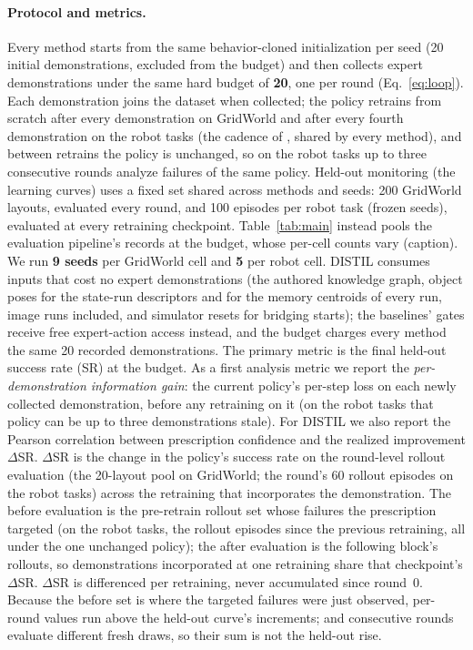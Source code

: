 \documentclass[letterpaper]{article} %
\begin{document}
\paragraph{Protocol and metrics.}
Every method starts from the same behavior-cloned initialization per seed
(20 initial demonstrations, excluded from the budget) and then collects
expert demonstrations under the same hard budget of \textbf{20}, one per
round (Eq.~\ref{eq:loop}). Each demonstration joins the dataset when collected;
the policy retrains from scratch after every demonstration on GridWorld and
after every fourth demonstration on the robot tasks (the cadence of
\citealp{lee2025diffdagger}, shared by every method), and between retrains
the policy is unchanged, so on the robot tasks up to three consecutive
rounds analyze failures of the same policy. Held-out monitoring (the
learning curves) uses a fixed set shared across methods and seeds: 200
GridWorld layouts, evaluated every round, and 100 episodes per robot task
(frozen seeds), evaluated at every retraining checkpoint.
Table~\ref{tab:main} instead pools the evaluation pipeline's records at
the budget, whose per-cell counts vary (caption). We
run \textbf{9 seeds} per
GridWorld cell and \textbf{5} per robot cell. DISTIL consumes inputs that
cost no expert demonstrations (the authored knowledge graph, object poses
for the state-run descriptors and for the memory centroids of every run,
image runs included, and simulator resets for bridging starts); the
baselines' gates receive free expert-action access instead, and the budget
charges every method the same 20 recorded demonstrations.
The primary metric is the final held-out success
rate (SR) at the budget. As a first analysis metric we report the
\emph{per-demonstration information gain}: the current policy's per-step
loss on each newly collected demonstration, before any retraining on it
(on the robot tasks that policy can be up to three demonstrations stale).
For DISTIL we also report the Pearson correlation between prescription
confidence and the realized improvement $\Delta$SR. $\Delta$SR is the
change in the policy's success rate on the round-level rollout evaluation
(the 20-layout pool on GridWorld; the round's 60 rollout episodes on the
robot tasks) across the retraining that incorporates the demonstration.
The before evaluation is the pre-retrain rollout set whose failures the
prescription targeted (on the robot tasks, the rollout episodes since the
previous retraining, all under the one unchanged
policy); the after evaluation is the following block's rollouts, so
demonstrations incorporated at one retraining share that checkpoint's
$\Delta$SR. $\Delta$SR is differenced per retraining, never accumulated
since round~0. Because the before set is where the targeted failures were
just observed, per-round values run above the held-out curve's
increments; and consecutive rounds evaluate different fresh draws, so
their sum is not the held-out rise.
\end{document}
